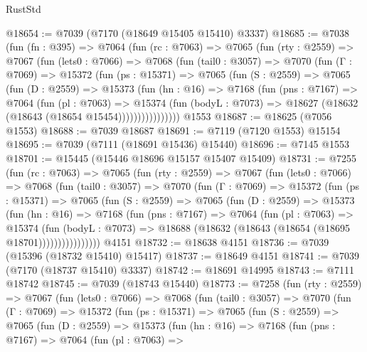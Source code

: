 \begin{lexlean}{RustStd}
\begin{coremodule}
@18654 := @7039 (@7170 (@18649 @15405 @15410) @3337)
@18685 := @7038
    (fun (fn : @395) =>
    @7064
      (fun (rc : @7063) =>
      @7065
        (fun (rty : @2559) =>
        @7067
          (fun (lets0 : @7066) =>
          @7068
            (fun (tail0 : @3057) =>
            @7070
              (fun (Γ : @7069) =>
              @15372
                (fun (ps : @15371) =>
                @7065
                  (fun (S : @2559) =>
                  @7065
                    (fun (D : @2559) =>
                    @15373
                      (fun (hn : @16) =>
                      @7168
                        (fun (pns : @7167) =>
                        @7064
                          (fun (pl : @7063) =>
                          @15374
                            (fun (bodyL : @7073) =>
                            @18627 (@18632 (@18643 (@18654 @15454))))))))))))))))
    @1553
@18687 := @18625 (@7056 @1553)
@18688 := @7039 @18687
@18691 := @7119 (@7120 @1553) @15154
@18695 := @7039 (@7111 (@18691 @15436) @15440)
@18696 := @7145 @1553
@18701 := @15445 (@15446 @18696 @15157 @15407 @15409)
@18731 := @7255
    (fun (rc : @7063) =>
    @7065
      (fun (rty : @2559) =>
      @7067
        (fun (lets0 : @7066) =>
        @7068
          (fun (tail0 : @3057) =>
          @7070
            (fun (Γ : @7069) =>
            @15372
              (fun (ps : @15371) =>
              @7065
                (fun (S : @2559) =>
                @7065
                  (fun (D : @2559) =>
                  @15373
                    (fun (hn : @16) =>
                    @7168
                      (fun (pns : @7167) =>
                      @7064
                        (fun (pl : @7063) =>
                        @15374
                          (fun (bodyL : @7073) =>
                          @18688 (@18632 (@18643 (@18654 (@18695 @18701))))))))))))))))
    @4151
@18732 := @18638 @4151
@18736 := @7039 (@15396 (@18732 @15410) @15417)
@18737 := @18649 @4151
@18741 := @7039 (@7170 (@18737 @15410) @3337)
@18742 := @18691 @14995
@18743 := @7111 @18742
@18745 := @7039 (@18743 @15440)
@18773 := @7258
    (fun (rty : @2559) =>
    @7067
      (fun (lets0 : @7066) =>
      @7068
        (fun (tail0 : @3057) =>
        @7070
          (fun (Γ : @7069) =>
          @15372
            (fun (ps : @15371) =>
            @7065
              (fun (S : @2559) =>
              @7065
                (fun (D : @2559) =>
                @15373
                  (fun (hn : @16) =>
                  @7168
                    (fun (pns : @7167) =>
                    @7064
                      (fun (pl : @7063) =>

\end{coremodule}
\end{lexlean}
